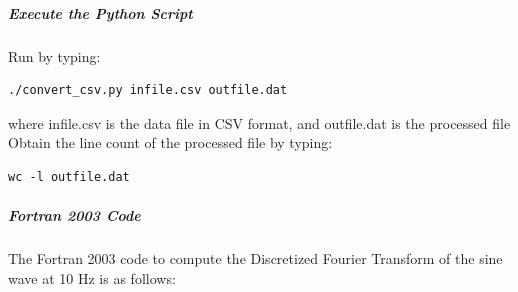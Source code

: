 \subparagraph{Execute the Python Script}

Run by typing:

\begin{verbatim}
./convert_csv.py infile.csv outfile.dat
\end{verbatim}

where infile.csv is the data file in CSV format, and outfile.dat is the processed file
Obtain the line count of the processed file by typing:

\begin{verbatim}
wc -l outfile.dat
\end{verbatim}

\subparagraph{Fortran 2003 Code}

The Fortran 2003 code to compute the Discretized Fourier Transform of the sine wave at 10 Hz is as follows:

